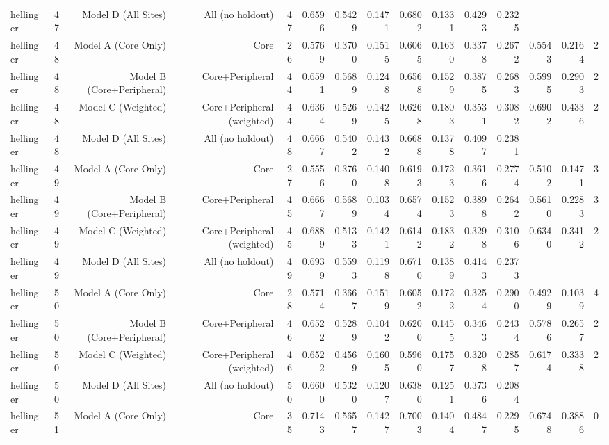 {\begin{longtable}{lrrrrrrrrrrrrrr}
  hellinger & 47 & Model D (All Sites) & All (no holdout) & 47 & 0.6596 & 0.5429 & 0.1471 & 0.6802 & 0.1331 & 0.4293 & 0.2325 &  &  &  \\
  hellinger & 48 & Model A (Core Only) & Core & 26 & 0.5769 & 0.3700 & 0.1515 & 0.6065 & 0.1630 & 0.3378 & 0.2672 & 0.5543 & 0.2164 & 2 \\
  hellinger & 48 & Model B (Core+Peripheral) & Core+Peripheral & 44 & 0.6591 & 0.5689 & 0.1248 & 0.6568 & 0.1529 & 0.3875 & 0.2683 & 0.5995 & 0.2903 & 2 \\
  hellinger & 48 & Model C (Weighted) & Core+Peripheral (weighted) & 44 & 0.6364 & 0.5269 & 0.1425 & 0.6268 & 0.1803 & 0.3531 & 0.3082 & 0.6902 & 0.4336 & 2 \\
  hellinger & 48 & Model D (All Sites) & All (no holdout) & 48 & 0.6667 & 0.5402 & 0.1432 & 0.6688 & 0.1378 & 0.4097 & 0.2381 &  &  &  \\
  hellinger & 49 & Model A (Core Only) & Core & 27 & 0.5556 & 0.3760 & 0.1408 & 0.6193 & 0.1723 & 0.3616 & 0.2774 & 0.5102 & 0.1471 & 3 \\
  hellinger & 49 & Model B (Core+Peripheral) & Core+Peripheral & 45 & 0.6667 & 0.5689 & 0.1034 & 0.6574 & 0.1523 & 0.3898 & 0.2642 & 0.5610 & 0.2283 & 3 \\
  hellinger & 49 & Model C (Weighted) & Core+Peripheral (weighted) & 45 & 0.6889 & 0.5133 & 0.1421 & 0.6142 & 0.1832 & 0.3298 & 0.3106 & 0.6340 & 0.3412 & 2 \\
  hellinger & 49 & Model D (All Sites) & All (no holdout) & 49 & 0.6939 & 0.5593 & 0.1198 & 0.6710 & 0.1389 & 0.4143 & 0.2373 &  &  &  \\
  hellinger & 50 & Model A (Core Only) & Core & 28 & 0.5714 & 0.3667 & 0.1519 & 0.6052 & 0.1722 & 0.3254 & 0.2900 & 0.4929 & 0.1039 & 4 \\
  hellinger & 50 & Model B (Core+Peripheral) & Core+Peripheral & 46 & 0.6522 & 0.5289 & 0.1042 & 0.6200 & 0.1455 & 0.3463 & 0.2434 & 0.5786 & 0.2657 & 2 \\
  hellinger & 50 & Model C (Weighted) & Core+Peripheral (weighted) & 46 & 0.6522 & 0.4569 & 0.1605 & 0.5960 & 0.1757 & 0.3208 & 0.2857 & 0.6174 & 0.3338 & 2 \\
  hellinger & 50 & Model D (All Sites) & All (no holdout) & 50 & 0.6600 & 0.5320 & 0.1207 & 0.6380 & 0.1251 & 0.3736 & 0.2084 &  &  &  \\
  hellinger & 51 & Model A (Core Only) & Core & 35 & 0.7143 & 0.5657 & 0.1427 & 0.7003 & 0.1404 & 0.4847 & 0.2295 & 0.6748 & 0.3886 & 0 \\

\end{longtable}}

